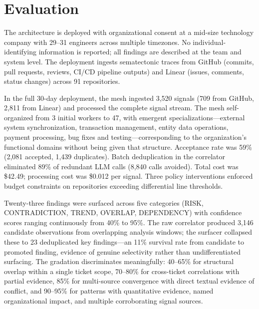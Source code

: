 \documentclass[11pt,a4paper]{article}
\begin{document}
\section{Evaluation}
\label{sec:evaluation}

The architecture is deployed with organizational consent at a mid-size technology company with 29--31 engineers across multiple timezones. No individual-identifying information is reported; all findings are described at the team and system level. The deployment ingests sematectonic traces from GitHub (commits, pull requests, reviews, CI/CD pipeline outputs) and Linear (issues, comments, status changes) across 91 repositories.

In the full 30-day deployment, the mesh ingested 3,520 signals (709 from GitHub, 2,811 from Linear) and processed the complete signal stream. The mesh self-organized from 3 initial workers to 47, with emergent specializations---external system synchronization, transaction management, entity data operations, payment processing, bug fixes and testing---corresponding to the organization's functional domains without being given that structure. Acceptance rate was 59\% (2,081 accepted, 1,439 duplicates). Batch deduplication in the correlator eliminated 89\% of redundant LLM calls (8,840 calls avoided). Total cost was \$42.49; processing cost was \$0.012 per signal. Three policy interventions enforced budget constraints on repositories exceeding differential line thresholds.

Twenty-three findings were surfaced across five categories (RISK, CONTRADICTION, TREND, OVERLAP, DEPENDENCY) with confidence scores ranging continuously from 40\% to 95\%. The raw correlator produced 3,146 candidate observations from overlapping analysis windows; the surfacer collapsed these to 23 deduplicated key findings---an 11\% survival rate from candidate to promoted finding, evidence of genuine selectivity rather than undifferentiated surfacing. The gradation discriminates meaningfully: 40--65\% for structural overlap within a single ticket scope, 70--80\% for cross-ticket correlations with partial evidence, 85\% for multi-source convergence with direct textual evidence of conflict, and 90--95\% for patterns with quantitative evidence, named organizational impact, and multiple corroborating signal sources.
\end{document}
